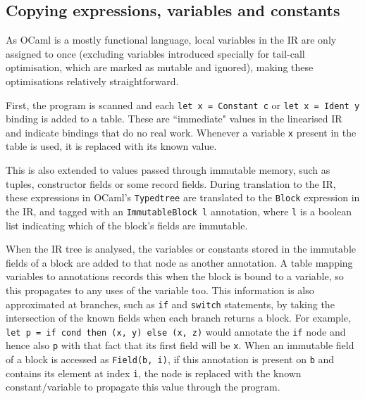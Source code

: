 \subsection{Copying expressions, variables and constants}
As OCaml is a mostly functional language, local variables in the IR are only assigned to once (excluding variables introduced specially for tail-call optimisation, which are marked as mutable and ignored), making these optimisations relatively straightforward. 

First, the program is scanned and each \verb|let x = Constant c| or \verb|let x = Ident y| binding is added to a table. %
These are ``immediate" values in the linearised IR and indicate bindings that do no real work. Whenever a variable \verb|x| present in the table is used, it is replaced with its known value. 

This is also extended to values passed through immutable memory, such as tuples, constructor fields or some record fields. During translation to the IR, these expressions in OCaml's \verb|Typedtree| are translated to the \verb|Block| expression in the IR, and tagged with an \verb|ImmutableBlock l| annotation, where \verb|l| is a boolean list indicating which of the block's fields are immutable. 

When the IR tree is analysed, the variables or constants stored in the immutable fields of a block are added to that node as another annotation. A table mapping variables to annotations records this when the block is bound to a variable, so this propagates to any uses of the variable too. This information is also approximated at branches, such as \verb|if| and \verb|switch| statements, by taking the intersection of the known fields when each branch returns a block. For example, \verb|let p = if cond then (x, y) else (x, z)| would annotate the \verb|if| node and hence also \verb|p| with that fact that its first field will be \verb|x|. 
When an immutable field of a block is accessed as \verb|Field(b, i)|, if this annotation is present on \verb|b| and contains its element at index \verb|i|, the node is replaced with the known constant/variable to propagate this value through the program.

